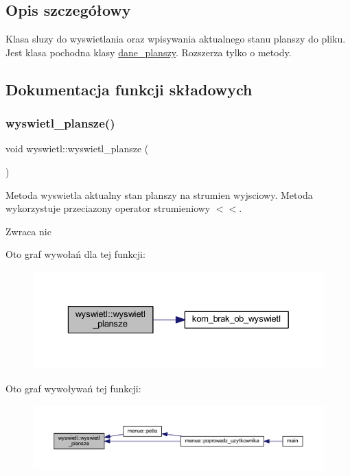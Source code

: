 \subsection{Opis szczegółowy}
Klasa sluzy do wyswietlania oraz wpisywania aktualnego stanu planszy do pliku. Jest klasa pochodna klasy \mbox{\hyperlink{classdane__planszy}{dane\+\_\+planszy}}. Rozszerza tylko o metody. 

\subsection{Dokumentacja funkcji składowych}
\mbox{\label{classwyswietl_a288a22bd278a0944739e792f3f2494fa}} 
\subsubsection{\texorpdfstring{wyswietl\+\_\+plansze()}{wyswietl\_plansze()}}
{\footnotesize\ttfamily void wyswietl\+::wyswietl\+\_\+plansze (\begin{DoxyParamCaption}{ }\end{DoxyParamCaption})}

Metoda wyswietla aktualny stan planszy na strumien wyjsciowy. Metoda wykorzystuje przeciazony operator strumieniowy $<$$<$. \begin{DoxyReturn}{Zwraca}
nic 
\end{DoxyReturn}
Oto graf wywołań dla tej funkcji\+:
\nopagebreak
\begin{figure}[H]
\begin{center}
\leavevmode
\includegraphics[width=329pt]{classwyswietl_a288a22bd278a0944739e792f3f2494fa_cgraph}
\end{center}
\end{figure}
Oto graf wywoływań tej funkcji\+:
\nopagebreak
\begin{figure}[H]
\begin{center}
\leavevmode
\includegraphics[width=350pt]{classwyswietl_a288a22bd278a0944739e792f3f2494fa_icgraph}
\end{center}
\end{figure}
\mbox{\label{classwyswietl_ac772602890ae0255a8ecc616f214b3db}} 
